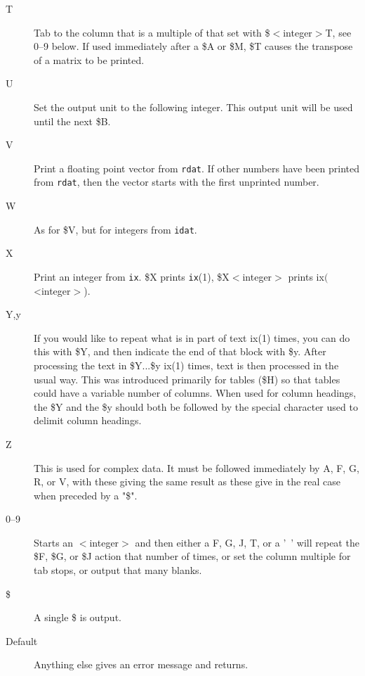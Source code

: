 \documentclass[12pt]{article}
\begin{document}
\begin{description}
\item[T] Tab to the column that is a multiple of that set with
  \$$<$integer$>$T, see 0--9 below.  If used immediately after a \$A or \$M, \$T
  causes the transpose of a matrix to be printed.

\item[U] Set the output unit to the following integer.  This output unit will be
  used until the next \$B.

\item[V] Print a floating point vector from {\tt rdat}.  If other numbers have
  been printed from {\tt rdat}, then the vector starts with the first unprinted
  number.

\item[W] As for \$V, but for integers from {\tt idat}.

\item[X] Print an integer from {\tt ix}. \$X prints {\tt ix}(1),
  \$X$<$integer$>$ prints ix$($<integer$>$).

\item[Y,y] If you would like to repeat what is in part of text ix(1) times, you
  can do this with \$Y, and then indicate the end of that block with \$y. After
  processing the text in \$Y...\$y ix(1) times, text is then processed in the
  usual way.  This was introduced primarily for tables (\$H) so that tables
  could have a variable number of columns.  When used for column headings, the
  \$Y and the \$y should both be followed by the special character used to
  delimit column headings.

\item[Z] This is used for complex data.  It must be followed immediately by A,
  F, G, R, or V, with these giving the same result as these give in the real
  case when preceded by a "\$".

\item[0--9] Starts an $<$integer$>$ and then either a F, G, J, T, or a '~' will
  repeat the \$F, \$G, or \$J action that number of times, or set the column
  multiple for tab stops, or output that many blanks.

\item[\$] A single \$ is output.

\item[Default] Anything else gives an error message and returns.
\end{description}
\end{document}
